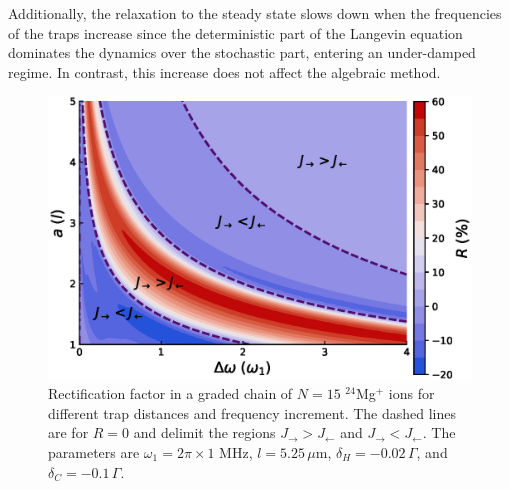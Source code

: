 Additionally, the relaxation to the steady state slows down when the frequencies of the traps increase since the deterministic part of the Langevin equation dominates the dynamics over the stochastic part, entering an under-damped regime. In contrast, this increase does not affect the
algebraic method.
\begin{figure}[t]
    \includegraphics[width=\linewidth]{Figures/Graded_24Mg_Rectification_VS_Gradient_and_lattConstant.eps}
    \caption{ Rectification factor in a graded chain of $N=15$ $^{24}$Mg$^+$ ions for different trap distances and frequency increment. The dashed lines are for $R = 0$ and delimit the regions $J_\rightarrow > J_\leftarrow$ and $J_\rightarrow < J_\leftarrow$. The parameters  are $\omega_1 = 2 \pi \times 1$ MHz, $l = 5.25\,\mu$m, $\delta_H = -0.02 \,\Gamma$, and $\delta_C = -0.1 \, \Gamma$.}
    \label{fig:Graded_24Mg_Rectification_VS_Gradient_and_lattConstant}
\end{figure}
%
%
%
%
